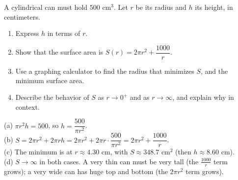 \begin{exo}{\calcreq}
A cylindrical can must hold $500$ cm$^3$. Let $r$ be its radius and $h$ its height, in centimeters.
\begin{enumerate}[label=(\alph*)]
\item Express $h$ in terms of $r$.
\item Show that the surface area is $S(r)=2\pi r^2+\dfrac{1000}{r}$.
\item Use a graphing calculator to find the radius that minimizes $S$, and the minimum surface area.
\item Describe the behavior of $S$ as $r\to0^+$ and as $r\to\infty$, and explain why in context.
\end{enumerate}
\begin{solution}
(a) $\pi r^2h=500$, so $h=\dfrac{500}{\pi r^2}$.\\
(b) $S=2\pi r^2+2\pi rh=2\pi r^2+2\pi r\cdot\dfrac{500}{\pi r^2}=2\pi r^2+\dfrac{1000}{r}$.\\
(c) The minimum is at $r\approx4.30$ cm, with $S\approx348.7$ cm$^2$ (then $h\approx8.60$ cm).\\
(d) $S\to\infty$ in both cases. A very thin can must be very tall (the $\frac{1000}{r}$ term grows); a very wide can has huge top and bottom (the $2\pi r^2$ term grows).
\end{solution}
\end{exo}
